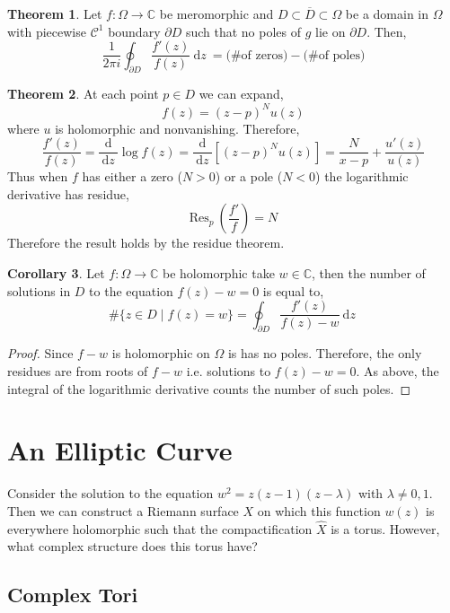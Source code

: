 \documentclass[12pt]{extarticle}
\newcommand{\C}{\mathbb{C}}
\renewcommand{\d}[1]{\: \mathrm{d}#1 \:}
\newcommand{\deriv}[2]{\frac{\d{#1}}{\d{#2}}}
\theoremstyle{definition}
\newtheorem{theorem}{Theorem}[section]
\newtheorem{corollary}[theorem]{Corollary}
\newcommand{\Res}[2]{\mathrm{Res}_{#1} \: #2}
\begin{document}
\begin{theorem}
Let $f : \Omega \to \C$ be meromorphic and $D \subset \overline{D} \subset \Omega$ be a domain in $\Omega$ with piecewise $\mathcal{C}^1$ boundary $\partial D$ such that no poles of $g$ lie on $\partial D$. Then,
\[ 
\frac{1}{2 \pi i} \oint_{\partial D} \frac{f'(z)}{f(z)} \d{z} = \text{(\# of zeros)} - \text{(\# of poles)}
\]
\end{theorem}

\begin{theorem}
At each point $p \in D$ we can expand,
\[ f(z) = (z - p)^N u(z) \]
where $u$ is holomorphic and nonvanishing. Therefore,
\[ \frac{f'(z)}{f(z)} = \deriv{}{z} \log{f(z)} = \deriv{}{z} \left[ (z - p)^N u(z) \right] = \frac{N}{x - p} + \frac{u'(z)}{u(z)} \]
Thus when $f$ has either a zero ($N > 0$) or a pole ($N < 0$) the logarithmic derivative has residue,
\[ \Res{p}{\left(\frac{f'}{f}\right)} = N \]
Therefore the result holds by the residue theorem. 
\end{theorem}

\begin{corollary}
Let $f : \Omega \to \C$ be holomorphic take $w \in \C$, then the number of solutions in $D$ to the equation $f(z) - w = 0$ is equal to,
\[ \#\{ z \in D \mid f(z) = w \} = \oint_{\partial D} \frac{f'(z)}{f(z) - w} \d{z}  \]
\end{corollary}

\begin{proof}
Since $f - w$ is holomorphic on $\Omega$ is has no poles. Therefore, the only residues are from roots of $f - w$ i.e. solutions to $f(z) - w = 0$. As above, the integral of the logarithmic derivative counts the number of such poles.  
\end{proof}

\section{An Elliptic Curve}

Consider the solution to the equation $w^2 = z (z - 1)(z - \lambda)$ with $\lambda \neq 0, 1$. Then we can construct a Riemann surface $X$ on which this function $w(z)$ is everywhere holomorphic such that the compactification $\hat{X}$ is a torus. However, what complex structure does this torus have?

\subsection{Complex Tori} 
\end{document}
